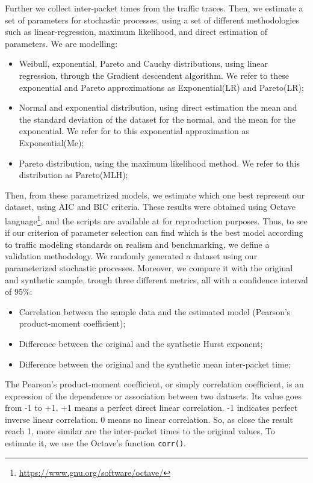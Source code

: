 Further we collect inter-packet times from the traffic traces. Then, we estimate a set of parameters for stochastic processes, using a set of different methodologies such as linear-regression, maximum likelihood, and direct estimation of parameters. We are modelling: 

\begin{itemize}
\item Weibull, exponential, Pareto and Cauchy distributions, using linear regression, through the Gradient descendent algorithm. We refer to these exponential and Pareto approximations as Exponential(LR) and Pareto(LR);
\item Normal and exponential distribution, using direct estimation the mean and the standard deviation of the dataset for the normal, and the mean for the exponential. We refer for to this exponential approximation as Exponential(Me);
\item Pareto distribution, using the maximum likelihood method. We refer to this distribution as Pareto(MLH);
\end{itemize}





Then, from these parametrized models, we estimate which one best represent our dataset, using AIC  and BIC criteria. These results were obtained using Octave language\footnote{ \url{https://www.gnu.org/software/octave/}}, and the scripts are available at \cite{projeto-github} for reproduction purposes. Thus, to see if our criterion of parameter selection can find which is the best model according to traffic modeling standards on realism and benchmarking\cite{validate-trafficgen}, we define a validation methodology. We randomly generated a dataset using our parameterized stochastic processes.  Moreover, we compare it with the original and synthetic sample, trough three different metrics, all with a confidence interval of 95\%:

\begin{itemize}
\item Correlation between the sample data and the estimated model (Pearson's product-moment coefficient);
\item Difference between the original and the synthetic Hurst exponent;
\item Difference between the original and the synthetic mean inter-packet time;
\end{itemize}

The Pearson's product-moment coefficient, or simply correlation coefficient,  is an expression of the dependence or association between two datasets. Its value goes from -1 to +1. +1 means a perfect direct linear correlation. -1 indicates perfect inverse linear correlation. 0 means no linear correlation. So, as close the result reach 1, more similar are the inter-packet times to the original values. To estimate it, we use the Octave's function \texttt{corr()}.


